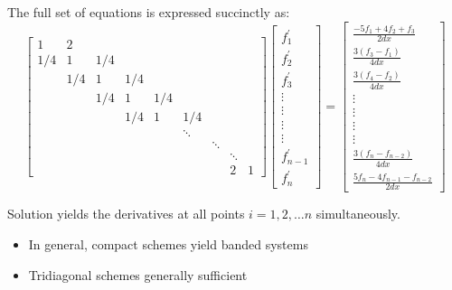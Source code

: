 \begin{frame}[t]
\footnotesize
The full set of equations is expressed succinctly as:
\begin{equation*}
 \begin{bmatrix}
     1&2\\
     1/4&1&1/4\\
     &1/4&1&1/4\\
     &&1/4&1&1/4\\
     &&&1/4&1&1/4\\
     &&&&&\ddots\\
     &&&&&&\ddots\\
     &&&&&&&\ddots\\
     &&&&&&&2&1
  \end{bmatrix}
  \boxed{
  \begin{bmatrix}
      f^{\prime}_1 \\
      f^{\prime}_2 \\
      f^{\prime}_3 \\
      \vdots \\
      \vdots \\
      \vdots \\
      \vdots \\
      f^{\prime}_{n-1} \\
      f^{\prime}_n
   \end{bmatrix}
   }
 =
 \begin{bmatrix}
     \frac{-5f_1 + 4f_2 + f_3}{2dx}\\
     \frac{3(f_{3} - f_{1})}{4dx}\\
     \frac{3(f_{4} - f_{2})}{4dx}\\
     \vdots\\
     \vdots\\
     \vdots\\
     \vdots\\
     \frac{3(f_{n} - f_{n-2})}{4dx}\\
     \frac{5f_{n} - 4f_{n-1} - f_{n-2}}{2dx}
  \end{bmatrix}
\end{equation*}

Solution yields the derivatives at all points
$i=1,2, \hdots n$ simultaneously.
\begin{itemize}
\item In general, compact schemes yield banded systems
\item Tridiagonal schemes generally sufficient
\end{itemize}
\end{frame}

